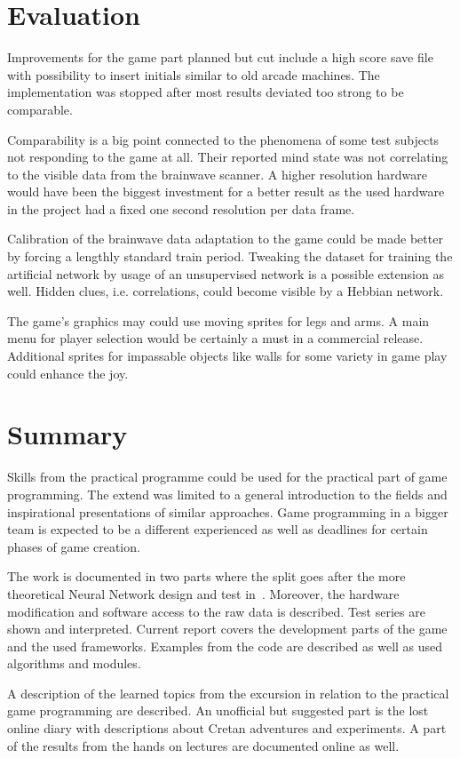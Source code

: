\documentclass[bibtotocnumbered, headsepline,normalheadings,12pt]{report}
\begin{document}
\chapter{Evaluation}
\label{chap:eva}

Improvements for the game part planned but cut include a high score save file with possibility to insert initials similar to old arcade machines.
The implementation was stopped after most results deviated too strong to be comparable.

Comparability is a big point connected to the phenomena of some test subjects not responding to the game at all. Their reported mind state was
not correlating to the visible data from the brainwave scanner. A higher resolution hardware would have been the biggest investment for a better result
as the used hardware in the project had a fixed one second resolution per data frame.  

Calibration of the brainwave data adaptation to the game could be made better by forcing a lengthly standard train period. Tweaking the dataset for
training the artificial network by usage of an unsupervised network is a possible extension as well. Hidden clues, i.e. correlations, could become visible
by a Hebbian network.

The game's graphics may could use moving sprites for legs and arms. A main menu for player selection would be certainly a must in a commercial release.
Additional sprites for impassable objects like walls for some variety in game play could enhance the joy.

\chapter{Summary}
\label{chap:sum}

Skills from the practical programme could be used for the practical part of game programming. The extend was limited to a general introduction to the 
fields and inspirational presentations of similar approaches. Game programming in a bigger team is expected to be a different experienced as well as 
deadlines for certain phases of game creation.

The work is documented in two parts where the split goes after the more theoretical Neural Network design and test in~\cite{pm}. Moreover, the 
hardware modification and software access to the raw data is described. Test series are shown and interpreted.
Current report covers the development parts of the game and the used frameworks. Examples from the code are described as well as used algorithms and modules.

A description of the learned topics from the excursion in relation to the practical game programming are described. An unofficial but suggested part is 
the lost online diary with descriptions about Cretan adventures and experiments. A part of the results from the hands on lectures are documented online as well.  

\nocite{*}


\listoffigures
\lstlistoflistings
\end{document}
